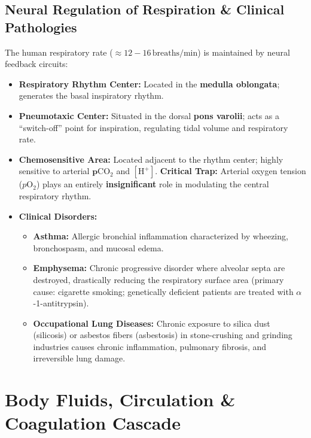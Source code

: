 \documentclass[10pt,twoside,openright]{book}
\begin{document}
\subsection{Neural Regulation of Respiration \& Clinical Pathologies}
The human respiratory rate ($\approx 12-16\,\text{breaths/min}$) is maintained by neural feedback circuits:
\begin{itemize}
  \item \textbf{Respiratory Rhythm Center:} Located in the \textbf{medulla oblongata}; generates the basal inspiratory rhythm.
  \item \textbf{Pneumotaxic Center:} Situated in the dorsal \textbf{pons varolii}; acts as a ``switch-off'' point for inspiration, regulating tidal volume and respiratory rate.
  \item \textbf{Chemosensitive Area:} Located adjacent to the rhythm center; highly sensitive to arterial $\mathbf{p\mathrm{CO_2}}$ and $\mathbf{[\mathrm{H}^+]}$. \textbf{Critical Trap:} Arterial oxygen tension ($p\mathrm{O_2}$) plays an entirely \textbf{insignificant} role in modulating the central respiratory rhythm.
  \item \textbf{Clinical Disorders:}
  \begin{itemize}
    \item \textbf{Asthma:} Allergic bronchial inflammation characterized by wheezing, bronchospasm, and mucosal edema.
    \item \textbf{Emphysema:} Chronic progressive disorder where alveolar septa are destroyed, drastically reducing the respiratory surface area (primary cause: cigarette smoking; genetically deficient patients are treated with $\alpha$-1-antitrypsin).
    \item \textbf{Occupational Lung Diseases:} Chronic exposure to silica dust (silicosis) or asbestos fibers (asbestosis) in stone-crushing and grinding industries causes chronic inflammation, pulmonary fibrosis, and irreversible lung damage.
  \end{itemize}
\end{itemize}

\section{Body Fluids, Circulation \& Coagulation Cascade}
\end{document}
